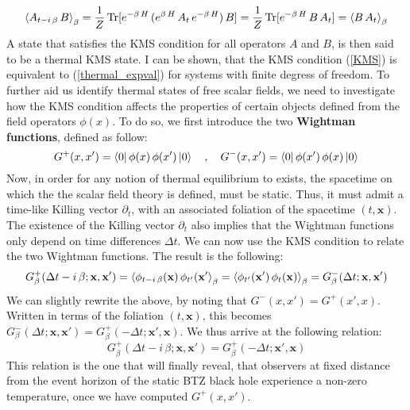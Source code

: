 %
%
\begin{equation}\label{KMS}
\braket{A_{t - i \, \beta} \, B}_{\beta}
= \frac{1}{Z} \, \mathrm{Tr}[e^{-\beta \, H} \, (e^{\beta \, H} \, A_t \, e^{-\beta \, H}) \, B]
= \frac{1}{Z} \, \mathrm{Tr}[e^{-\beta \, H} \, B \, A_t]
= \braket{B \, A_t}_{\beta}
\end{equation}
%
%
A state that satisfies the KMS condition for all operators $A$ and $B$, is then said to be a thermal KMS state. I can be shown, that the KMS condition (\ref{KMS}) is equivalent to (\ref{thermal_expval}) for systems with finite degress of freedom. To further aid us identify thermal states of free scalar fields, we need to investigate how the KMS condition affects the properties of certain objects defined from the field operators $\phi(x)$. To do so, we first introduce the two \textbf{Wightman functions}, defined as follow:
%
%
\begin{equation}
G^+(x, x') = \bra{0} \phi(x) \, \phi(x') \ket{0}
\quad , \quad
G^-(x, x') = \bra{0} \phi(x') \, \phi(x) \ket{0}
\end{equation}
%
%
Now, in order for any notion of thermal equilibrium to exists, the spacetime on which the the scalar field theory is defined, must be static. Thus, it must admit a time-like Killing vector $\partial_t$, with an associated foliation of the spacetime $(t, \mathbf{x})$. The existence of the Killing vector $\partial_t$ also implies that the Wightman functions only depend on time differences $\Delta t$. We can now use the KMS condition to relate the two Wightman functions. The result is the following:
%
%
\begin{equation}
G^+_{\beta}(\Delta t - i \, \beta; \mathbf{x}, \mathbf{x'})
= \braket{\phi_{t - i \, \beta}(\mathbf{x}) \, \phi_{t'}(\mathbf{x'}}_{\beta}
= \braket{\phi_{t'}(\mathbf{x'}) \, \phi_{t}(\mathbf{x})}_{\beta}
= G^-_{\beta}(\Delta t; \mathbf{x}, \mathbf{x'})
\end{equation}
%
%
We can slightly rewrite the above, by noting that $G^-(x, x') = G^+(x', x)$. Written in terms of the foliation $(t, \mathbf{x})$, this becomes $G^-_{\beta}(\Delta t; \mathbf{x}, \mathbf{x'}) = G^+_{\beta}(-\Delta t; \mathbf{x'}, \mathbf{x})$. We thus arrive at the following relation:
%
%
%
%
\begin{equation}\label{KMScond}
\boxed{
G^+_{\beta}(\Delta t - i \, \beta; \mathbf{x}, \mathbf{x'})
= G^+_{\beta}(-\Delta t; \mathbf{x'}, \mathbf{x})
}
\end{equation}
%
%
This relation is the one that will finally reveal, that observers at fixed distance from the event horizon of the static BTZ black hole experience a non-zero temperature, once we have computed $G^+(x,x')$.

